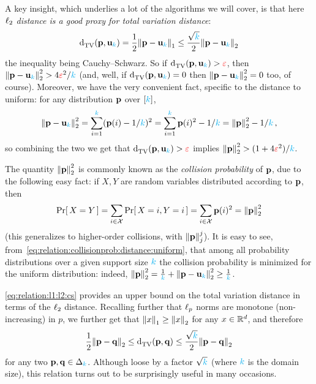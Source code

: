 A key insight, which underlies a lot of the algorithms we will cover, is that here \emph{$\lp[2]$ distance is a good proxy for total variation distance}:
\begin{equation}
  \label{eq:relation:l1:l2:cs}
  \totalvardist{\p}{\uniform_\ab} = \frac{1}{2}\normone{\p-\uniform_\ab} \leq \frac{\sqrt{\ab}}{2}\normtwo{\p-\uniform_\ab}
\end{equation}
the inequality being Cauchy--Schwarz. So if $\totalvardist{\p}{\uniform_\ab}>\dst$, then $\normtwo{\p-\uniform_\ab}^2 > 4\dst^2/\ab$ (and, well, if $\totalvardist{\p}{\uniform_\ab}=0$ then $\normtwo{\p-\uniform_\ab}^2=0$ too, of course). Moreover, we have the very convenient fact, specific to the distance to uniform: for any distribution $\p$ over $[\ab]$,
\begin{equation}
  \label{eq:relation:collisionprob:distance:uniform}
  \normtwo{\p-\uniform_\ab}^2 = \sum_{i=1}^\ab (\p(i)-1/\ab)^2  = \sum_{i=1}^\ab \p(i)^2-1/\ab = \normtwo{\p}^2-1/\ab\,,
\end{equation}
so combining the two we get that $\totalvardist{\p}{\uniform_\ab}>\dst$ implies $\normtwo{\p}^2 > (1+4\dst^2)/\ab$.

\begin{remark}
  \label{rk:collision:probability}
  The quantity $\normtwo{\p}^2$ is commonly known as the \emph{collision probability} of $\p$, due to the following easy fact: if $X,Y$ are \iid random variables distributed according to $\p$, then
  \begin{equation}
      \probaOf{X=Y} = \sum_{i\in\domain} \probaOf{X=i, Y=i} = \sum_{i\in\domain} \p(i)^2 = \normtwo{\p}^2
  \end{equation}
  (this generalizes to higher-order collisions, with $\norm{\p}_j^j$). It is easy to see, from~\cref{eq:relation:collisionprob:distance:uniform}, that among all probability distributions over a given support size $\ab$ the collision probability is minimized for the uniform distribution: indeed, $\normtwo{\p}^2 = \frac{1}{\ab}+ \normtwo{\p-\uniform_\ab}^2 \geq \frac{1}{\ab}$. 
\end{remark}

\begin{remark}
  \label{rk:relation:l1:l2}
  \cref{eq:relation:l1:l2:cs} provides an upper bound on the total variation distance in terms of the $\lp[2]$ distance. Recalling further that $\lp[p]$ norms are monotone (non-increasing) in $p$, we further get that $\normone{x}\geq \normtwo{x}$ for any $x\in\R^d$, and therefore
\begin{equation}
  \label{eq:relation:l1:l2:overall}
  \frac{1}{2}\normtwo{\p-\q} \leq \totalvardist{\p}{\q} \leq \frac{\sqrt{\ab}}{2}\normtwo{\p-\q}
\end{equation}
for any two $\p,\q\in\distribs{\ab}$. Although loose by a factor $\sqrt{\ab}$ (where $\ab$ is the domain size), this relation turns out to be surprisingly useful in many occasions.
\end{remark}

